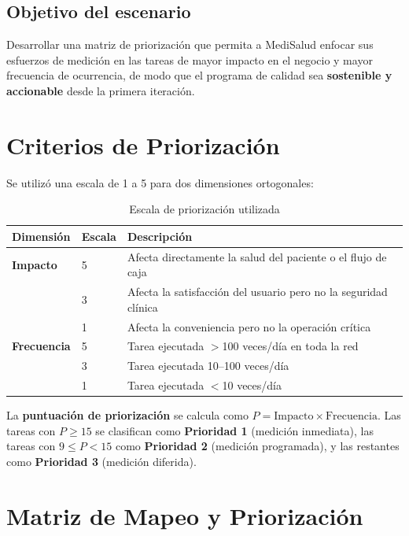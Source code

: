 \documentclass[12pt,a4paper]{article}
\begin{document}
\subsection{Objetivo del escenario}
Desarrollar una matriz de priorizaci\'on que permita a MediSalud enfocar sus esfuerzos de medici\'on en las tareas de mayor impacto en el negocio y mayor frecuencia de ocurrencia, de modo que el programa de calidad sea \textbf{sostenible y accionable} desde la primera iteraci\'on.

\section{Criterios de Priorizaci\'on}

Se utiliz\'o una escala de 1 a 5 para dos dimensiones ortogonales:

\begin{table}[H]
\centering
\caption{Escala de priorizaci\'on utilizada}
\begin{tabular}{l l l}
\toprule
\textbf{Dimensi\'on} & \textbf{Escala} & \textbf{Descripci\'on} \\
\midrule
\textbf{Impacto} & 5 & Afecta directamente la salud del paciente o el flujo de caja \\
                  & 3 & Afecta la satisfacci\'on del usuario pero no la seguridad cl\'inica \\
                  & 1 & Afecta la conveniencia pero no la operaci\'on cr\'itica \\
\textbf{Frecuencia} & 5 & Tarea ejecutada $>$100 veces/d\'ia en toda la red \\
                     & 3 & Tarea ejecutada 10--100 veces/d\'ia \\
                     & 1 & Tarea ejecutada $<$10 veces/d\'ia \\
\bottomrule
\end{tabular}
\end{table}

La \textbf{puntuaci\'on de priorizaci\'on} se calcula como $P = \text{Impacto} \times \text{Frecuencia}$. Las tareas con $P \ge 15$ se clasifican como \textbf{Prioridad 1} (medici\'on inmediata), las tareas con $9 \le P < 15$ como \textbf{Prioridad 2} (medici\'on programada), y las restantes como \textbf{Prioridad 3} (medici\'on diferida).

\section{Matriz de Mapeo y Priorizaci\'on}
\end{document}
